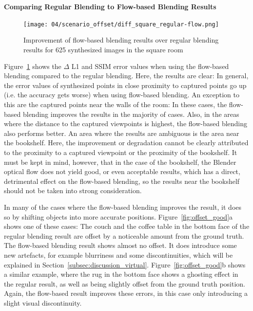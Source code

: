 \paragraph{Comparing Regular Blending to Flow-based Blending Results}

\begin{figure}
		\centering
		\texttt{[image: 04/scenario\_offset/diff\_square\_regular-flow.png]}
		\caption{Improvement of flow-based blending results over regular blending results for 625 synthesized images in the square room}
		\label{fig:scenario_offset_diff}
\end{figure}

Figure~\ref{fig:scenario_offset_diff} shows the $\Delta$ L1 and SSIM error values when using the flow-based blending compared to the regular blending. Here, the results are clear: In general, the error values of synthesized points in close proximity to captured points go up (i.e. the accuracy gets worse) when using flow-based blending. An exception to this are the captured points near the walls of the room: In these cases, the flow-based blending improves the results in the majority of cases. Also, in the areas where the distance to the captured viewpoints is highest, the flow-based blending also performs better. An area where the results are ambiguous is the area near the bookshelf. Here, the improvement or degradation cannot be clearly attributed to the proximity to a captured viewpoint or the proximity of the bookshelf. It must be kept in mind, however, that in the case of the bookshelf, the Blender optical flow does not yield good, or even acceptable results, which has a direct, detrimental effect on the flow-based blending, so the results near the bookshelf should not be taken into strong consideration.

In many of the cases where the flow-based blending improves the result, it does so by shifting objects into more accurate positions. Figure~\ref{fig:offset_good}a shows one of these cases: The couch and the coffee table in the bottom face of the regular blending result are offset by a noticeable amount from the ground truth. The flow-based blending result shows almost no offset. It does introduce some new artefacts, for example blurriness and some discontinuities, which will be explained in Section~\ref{subsec:discussion_virtual}. Figure~\ref{fig:offset_good}b shows a similar example, where the rug in the bottom face shows a ghosting effect in the regular result, as well as being slightly offset from the ground truth position. Again, the flow-based result improves these errors, in this case only introducing a slight visual discontinuity.

